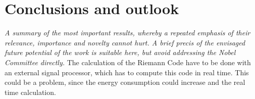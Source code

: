 \chapter{Conclusions and outlook}
\textit{A summary of the most important results, whereby a repeated emphasis of their relevance, importance and novelty cannot hurt. A brief precis of the envisaged future potential of the work is suitable here, but avoid addressing the Nobel Committee directly.}
The calculation of the Riemann Code have to be done with an external signal processor, which has to compute this code in real time. 
This could be a problem, since the energy consumption could increase and the real time calculation.